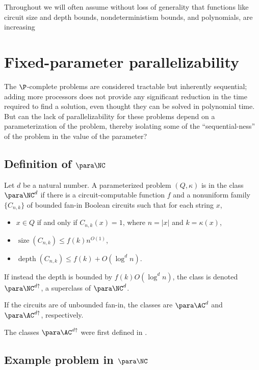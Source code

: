\documentclass{article}
\DeclareMathOperator{\depth}{depth}
\DeclareMathOperator{\size}{size}
\begin{document}
Throughout we will often assume without loss of generality that functions like circuit size and depth bounds, nondeterministism bounds, and polynomials, are increasing

\section{Fixed-parameter parallelizability}
\label{sec:pcompletefpp}

The $\P$-complete problems are considered tractable but inherently sequential; adding more processors does not provide any significant reduction in the time required to find a solution, even thought they can be solved in polynomial time.
But can the lack of parallelizability for these problems depend on a parameterization of the problem, thereby isolating some of the ``sequential-ness'' of the problem in the value of the parameter?

\subsection{Definition of \texorpdfstring{$\para \NC$}{paraNC}}

\begin{definition}[$\para \NC^d$]
  Let $d$ be a natural number.
  A parameterized problem $(Q, \kappa)$ is in the class $\para \NC^d$ if there is a circuit-computable function $f$ and a nonuniform family $\{C_{n, k}\}$ of bounded fan-in Boolean circuits such that for each string $x$,
  \begin{itemize}
  \item $x \in Q$ if and only if $C_{n, k}(x) = 1$, where $n = |x|$ and $k = \kappa(x)$,
  \item $\size(C_{n, k}) \leq f(k) n^{O(1)}$,
  \item $\depth(C_{n, k}) \leq f(k) + O(\log^d n)$.
  \end{itemize}
  If instead the depth is bounded by $f(k) O(\log^d n)$, the class is denoted $\para \NC^{d \uparrow}$, a superclass of $\para \NC^d$.

  If the circuits are of unbounded fan-in, the classes are $\para \AC^d$ and $\para \AC^{d \uparrow}$, respectively.
\end{definition}

The classes $\para \AC^{d \uparrow}$ were first defined in \autocite{bst15}.

\subsection{Example problem in \texorpdfstring{$\para \NC$}{paraNC}}
\end{document}
